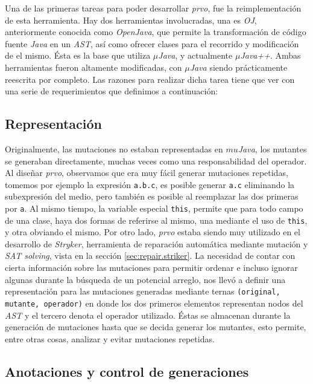 Una de las primeras tareas para poder desarrollar \emph{prvo}, fue la reimplementaci\'on de esta herramienta. Hay dos herramientas involucradas, una es \emph{OJ}, anteriormente conocida como \emph{OpenJava}, que permite la transformaci\'on de c\'odigo fuente \emph{Java} en un \emph{AST}, as\'i como ofrecer clases para el recorrido y modificaci\'on de el mismo. \'Esta es la base que utiliza \emph{$\mu$Java}, y actualmente \emph{$\mu$Java++}. Ambas herramientas fueron altamente modificadas, con \emph{$\mu$Java} siendo pr\'acticamente reescrita por completo. Las razones para realizar dicha tarea tiene que ver con una serie de requerimientos que definimos a continuaci\'on:

\subsection{Representaci\'on}

Originalmente, las mutaciones no estaban representadas en \emph{$mu$Java}, los mutantes se generaban directamente, muchas veces como una responsabilidad del operador. Al dise\~nar \emph{prvo}, observamos que era muy f\'acil generar mutaciones repetidas, tomemos por ejemplo la expresi\'on \lstinline|a.b.c|, es posible generar \lstinline|a.c| eliminando la subexpresi\'on del medio, pero tambi\'en es posible al reemplazar las dos primeras por \lstinline|a|. Al mismo tiempo, la variable especial \lstinline|this|, permite que para todo campo de una clase, haya dos formas de referirse al mismo, una mediante el uso de \lstinline|this|, y otra obviando el mismo. Por otro lado, \emph{prvo} estaba siendo muy utilizado en el desarrollo de \emph{Stryker}, herramienta de reparaci\'on autom\'atica mediante mutaci\'on y \emph{SAT solving}, vista en la secci\'on \ref{sec:repair.striker}. La necesidad de contar con cierta informaci\'on sobre las mutaciones para permitir ordenar e incluso ignorar algunas durante la b\'usqueda de un potencial arreglo, nos llev\'o a definir una representaci\'on para las mutaciones generadas mediante ternas \texttt{(original, mutante, operador)} en donde los dos primeros elementos representan nodos del \emph{AST} y el tercero denota el operador utilizado. \'Estas se almacenan durante la generaci\'on de mutaciones hasta que se decida generar los mutantes, esto permite, entre otras cosas, analizar y evitar mutaciones repetidas.

\subsection{Anotaciones y control de generaciones}

